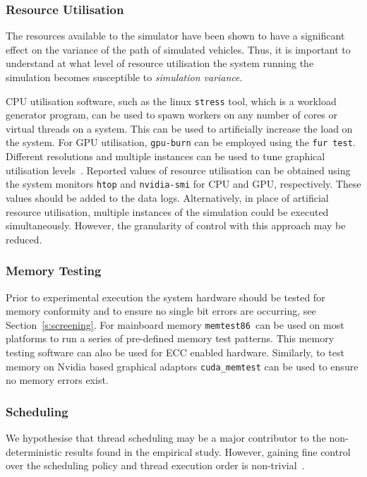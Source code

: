 \subsubsection{Resource Utilisation}
The resources available to the simulator have been shown to have a significant effect on the variance of the path of simulated vehicles. Thus, it is important to understand at what level of resource utilisation the system running the simulation becomes susceptible to \textit{simulation variance}.

CPU utilisation software, such as the linux \texttt{stress} tool, which is a workload generator program, can be used to spawn workers on any number of cores or virtual threads on a system. This can be used to artificially increase the load on the system. For GPU utilisation, \texttt{gpu-burn} can be employed using the \texttt{fur test}. Different resolutions and multiple instances can be used to tune graphical utilisation levels~\cite{GPU_stress}. Reported values of resource utilisation can be obtained using the system monitors \texttt{htop} and \texttt{nvidia-smi} for CPU and GPU, respectively. These values should be added to the data logs. Alternatively, in place of artificial resource utilisation, multiple instances of the simulation could be executed simultaneously. However, the granularity of control with this approach may be reduced.

\subsubsection{Memory Testing}
Prior to experimental execution the system hardware should be tested for memory conformity and to ensure no single bit errors are occurring, see Section~\ref{s:screening}. For mainboard memory \texttt{memtest86}\ can be used on most platforms to run a series of pre-defined memory test patterns. This memory testing software can also be used for ECC enabled hardware. Similarly, to test memory on Nvidia based graphical adaptors \texttt{cuda\_memtest} can be used to ensure no memory errors exist.

\subsubsection{Scheduling}
We hypothesise that thread scheduling may be a major contributor to the non-deterministic results found in the empirical study. However, gaining fine control over the scheduling policy and thread execution order is non-trivial~\cite{acm-q-rr-interview}. 

